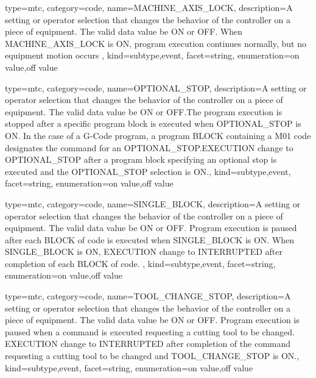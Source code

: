 {
  type=mtc,
  category=code,
  name={MACHINE\_AXIS\_LOCK},
  description={A setting or operator selection that changes the behavior of the controller on a piece of equipment.  The \gls{valid data value} \must be ON or OFF. \newline When MACHINE\_AXIS\_LOCK is ON, program execution continues normally, but no equipment motion occurs },
  kind={subtype,event},
  facet={\gls{string}},
  enumeration={\gls{on value},\gls{off value}}
}


{
  type=mtc,
  category=code,
  name={OPTIONAL\_STOP},
  description={A setting or operator selection that changes the behavior of the controller on a piece of equipment.  The \gls{valid data value} \must be ON or OFF.The program execution is stopped after a specific program block is executed when OPTIONAL\_STOP is ON.    \newline In the case of a G-Code program, a program BLOCK containing a M01 code designates the command for an OPTIONAL\_STOP.EXECUTION \must change to OPTIONAL\_STOP after a program block specifying an optional stop is executed and the OPTIONAL\_STOP selection is ON.},
  kind={subtype,event},
  facet={\gls{string}},
  enumeration={\gls{on value},\gls{off value}}
}


{
  type=mtc,
  category=code,
  name={SINGLE\_BLOCK},
  description={A setting or operator selection that changes the behavior of the controller on a piece of equipment.  The \gls{valid data value} \must be ON or OFF. Program execution is paused after each BLOCK of code is executed when SINGLE\_BLOCK is ON.   \newline When SINGLE\_BLOCK is ON, EXECUTION \must change to INTERRUPTED after completion of each BLOCK of code. },
  kind={subtype,event},
  facet={\gls{string}},
  enumeration={\gls{on value},\gls{off value}}
}


{
  type=mtc,
  category=code,
  name={TOOL\_CHANGE\_STOP},
  description={A setting or operator selection that changes the behavior of the controller on a piece of equipment.  The \gls{valid data value} \must be ON or OFF. Program execution is paused when a command is executed requesting a cutting tool to be changed. EXECUTION \must change to INTERRUPTED after completion of the command requesting a cutting tool to be changed and TOOL\_CHANGE\_STOP is ON.},
  kind={subtype,event},
  facet={\gls{string}},
  enumeration={\gls{on value},\gls{off value}}
}


